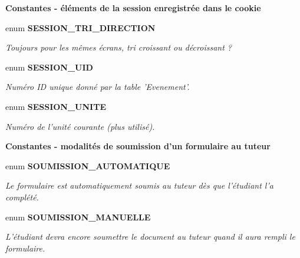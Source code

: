 \begin{Indent}{\bf Constantes - éléments de la session enregistrée dans le cookie}
\begin{CompactItemize}
enum {\bf SESSION\_\-TRI\_\-DIRECTION} 
\begin{CompactList}\small\item\em Toujours pour les mêmes écrans, tri croissant ou décroissant ? \item\end{CompactList}\item 
enum {\bf SESSION\_\-UID} 
\begin{CompactList}\small\item\em Numéro ID unique donné par la table 'Evenement'. \item\end{CompactList}\item 
enum {\bf SESSION\_\-UNITE} 
\begin{CompactList}\small\item\em Numéro de l'unité courante (plus utilisé). \item\end{CompactList}\end{CompactItemize}
\end{Indent}
\begin{Indent}{\bf Constantes - modalités de soumission d'un formulaire au tuteur}\par
\begin{CompactItemize}
\item 
enum {\bf SOUMISSION\_\-AUTOMATIQUE} 
\begin{CompactList}\small\item\em Le formulaire est automatiquement soumis au tuteur dès que l'étudiant l'a complété. \item\end{CompactList}\item 
enum {\bf SOUMISSION\_\-MANUELLE} 
\begin{CompactList}\small\item\em L'étudiant devra encore soumettre le document au tuteur quand il aura rempli le formulaire. \item\end{CompactList}\end{CompactItemize}
\end{Indent}

